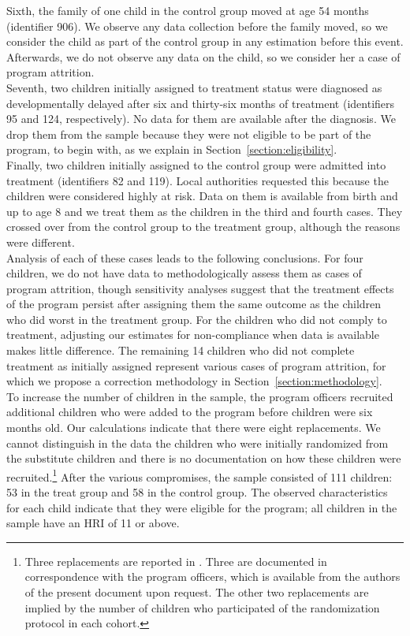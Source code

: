 \noindent Sixth, the family of one child in the control group moved at age 54 months (identifier 906). We observe any data collection before the family moved, so we consider the child as part of the control group in any estimation before this event. Afterwards, we do not observe any data on the child, so we consider her a case of program attrition.\\

\noindent Seventh, two children initially assigned to treatment status were diagnosed as developmentally delayed after six and thirty-six months of treatment (identifiers 95 and 124, respectively). No data for them are available after the diagnosis. We drop them from the sample because they were not eligible to be part of the program, to begin with, as we explain in Section~\ref{section:eligibility}.\\

\noindent Finally, two children initially assigned to the control group were admitted into treatment (identifiers 82 and 119). Local authorities requested this because the children were considered highly at risk. Data on them is available from birth and up to age 8 and we treat them as the children in the third and fourth cases. They crossed over from the control group to the treatment group, although the reasons were different.\\

\noindent Analysis of each of these cases leads to the following conclusions. For four children, we do not have data to methodologically assess them as cases of program attrition, though sensitivity analyses suggest that the treatment effects of the program persist after assigning them the same outcome as the children who did worst in the treatment group. For the children who did not comply to treatment, adjusting our estimates for non-compliance when data is available makes little difference. The remaining 14 children who did not complete treatment as initially assigned represent various cases of program attrition, for which we propose a correction methodology in Section~\ref{section:methodology}.\\

\noindent To increase the number of children in the sample, the program officers recruited additional children who were added to the program before children were six months old. Our calculations indicate that there were eight replacements. We cannot distinguish in the data the children who were initially randomized from the substitute children and there is no documentation on how these children were recruited.\footnote{Three replacements are reported in \citet{Ramey_Campbell_1979_SR}. Three are documented in correspondence with the program officers, which is available from the authors of the present document upon request. The other two replacements are implied by the number of children who participated of the randomization protocol in each cohort.} After the various compromises, the sample consisted of 111 children: 53 in the treat group and 58 in the control group. The observed characteristics for each child indicate that they were eligible for the program; all children in the sample have an HRI of 11 or above. \\

